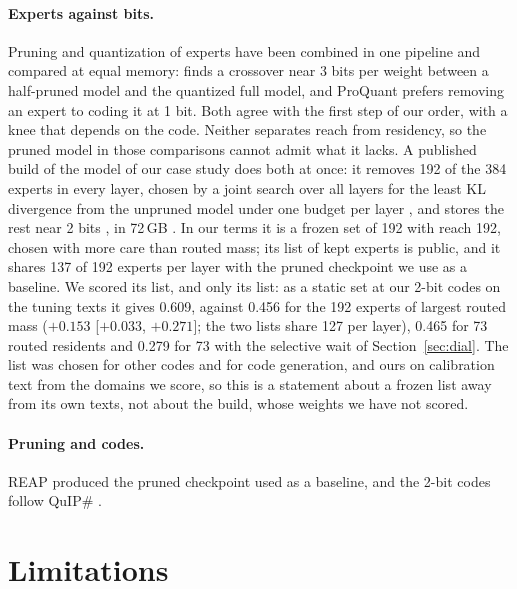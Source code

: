 \documentclass[11pt]{article}
\newcommand{\ci}[2]{[$#1$, $#2$]}
\begin{document}
\paragraph{Experts against bits.} Pruning and quantization of experts have been combined in one
pipeline \citep{huang2024mc,chen2025eacmoe,chen2025collaborative} and compared at equal memory:
\citet{jha2026half} finds a crossover near 3 bits per weight between a half-pruned model and the
quantized full model, and ProQuant \citep{chen2026proquant} prefers removing an expert to coding
it at 1 bit. Both agree with the first step of our order, with a knee that depends on the code.
Neither separates reach from residency, so the pruned model in those comparisons cannot admit
what it lacks.
A published build of the model of our case study does both at once: it removes 192 of the 384
experts in every layer, chosen by a joint search over all layers for the least KL divergence from
the unpruned model under one budget per layer \citep{helcig2026rco}, and stores the rest near 2
bits \citep{dadgarnia2026gsq}, in 72\,GB \citep{daslab2026coder}. In our terms it is a frozen set
of 192 with reach 192, chosen with more care than routed mass; its list of kept experts is public,
and it shares 137 of 192 experts per layer with the pruned checkpoint we use as a baseline. We scored its
list, and only its list: as a static set at our 2-bit codes on the tuning texts it gives 0.609,
against 0.456 for the 192 experts of largest routed mass ($+0.153$ \ci{+0.033}{+0.271}; the two
lists share 127 per layer), 0.465 for 73 routed residents and 0.279 for 73 with the selective wait
of Section~\ref{sec:dial}. The list was chosen for other codes and for code generation, and ours on
calibration text from the domains we score, so this is a statement about a frozen list away from its
own texts, not about the build, whose weights we have not scored.

\paragraph{Pruning and codes.} REAP \citep{lasby2025reap} produced the pruned checkpoint used
as a baseline, and the 2-bit codes follow QuIP\# \citep{tseng2024quipsharp}.

\section{Limitations}
\end{document}
